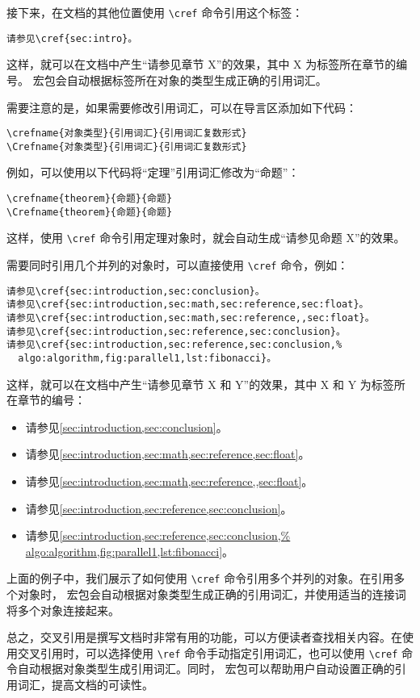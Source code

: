 接下来，在文档的其他位置使用 \verb|\cref| 命令引用这个标签：
\begin{Verbatim}
请参见\cref{sec:intro}。
\end{Verbatim}
这样，就可以在文档中产生“请参见章节 X”的效果，其中 X 为标签所在章节的编号。 宏包会自动根据标签所在对象的类型生成正确的引用词汇。

需要注意的是，如果需要修改引用词汇，可以在导言区添加如下代码：

\begin{Verbatim}
\crefname{对象类型}{引用词汇}{引用词汇复数形式}
\Crefname{对象类型}{引用词汇}{引用词汇复数形式}
\end{Verbatim}

例如，可以使用以下代码将“定理”引用词汇修改为“命题”：
\begin{Verbatim}
\crefname{theorem}{命题}{命题}
\Crefname{theorem}{命题}{命题}
\end{Verbatim}
这样，使用 \verb|\cref| 命令引用定理对象时，就会自动生成“请参见命题 X”的效果。

需要同时引用几个并列的对象时，可以直接使用 \verb|\cref| 命令，例如：
\begin{Verbatim}
请参见\cref{sec:introduction,sec:conclusion}。
请参见\cref{sec:introduction,sec:math,sec:reference,sec:float}。
请参见\cref{sec:introduction,sec:math,sec:reference,,sec:float}。
请参见\cref{sec:introduction,sec:reference,sec:conclusion}。
请参见\cref{sec:introduction,sec:reference,sec:conclusion,%
  algo:algorithm,fig:parallel1,lst:fibonacci}。
\end{Verbatim}

这样，就可以在文档中产生“请参见章节 X 和 Y”的效果，其中 X 和 Y 为标签所在章节的编号：
\begin{itemize}
  \item 请参见\cref{sec:introduction,sec:conclusion}。
  \item 请参见\cref{sec:introduction,sec:math,sec:reference,sec:float}。
  \item 请参见\cref{sec:introduction,sec:math,sec:reference,,sec:float}。
  \item 请参见\cref{sec:introduction,sec:reference,sec:conclusion}。
  \item 请参见\cref{sec:introduction,sec:reference,sec:conclusion,%
        algo:algorithm,fig:parallel1,lst:fibonacci}。
\end{itemize}

上面的例子中，我们展示了如何使用 \verb|\cref| 命令引用多个并列的对象。在引用多个对象时， 宏包会自动根据对象类型生成正确的引用词汇，并使用适当的连接词将多个对象连接起来。

总之，交叉引用是撰写文档时非常有用的功能，可以方便读者查找相关内容。在使用交叉引用时，可以选择使用 \verb|\ref| 命令手动指定引用词汇，也可以使用 \verb|\cref| 命令自动根据对象类型生成引用词汇。同时， 宏包可以帮助用户自动设置正确的引用词汇，提高文档的可读性。
